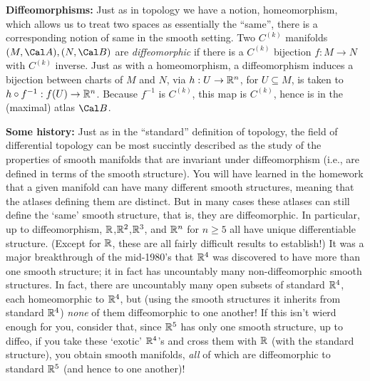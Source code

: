 \msk

{\bf Diffeomorphisms:} Just as in topology we have a notion, homeomorphism, which allows us to 
treat two spaces as essentially the ``same'', there is a corresponding 
notion of same in the smooth setting. Two $C^{(k)}$ manifolds $(M,{\Cal A}),(N,{\Cal B})$
are {\it diffeomorphic} if there is a $C^{(k)}$ bijection $f:M\rightarrow N$ with
$C^{(k)}$ inverse. Just as with a homeomorphism, a diffeomorphism induces a
bijection between charts of $M$ and $N$, via 
$h:U\rightarrow {\Bbb R}^n$, for $U\subseteq M$, is taken to 
$h\circ f^{-1}:f(U)\rightarrow {\Bbb R}^n$. Because $f^{-1}$ is $C^{(k)}$, this
map is $C^{(k)}$, hence is in the (maximal) atlas ${\Cal B}$.


{\bf Some history:} Just as in the ``standard'' definition of topology, the field of 
differential topology 
can be most succintly described as the study of the properties of smooth manifolds that
are invariant under diffeomorphism (i.e., are defined in terms of the smooth
structure). You will have learned in the homework that a given manifold can have
many different smooth structures, meaning that the atlases defining them are distinct.
But in many cases these atlases can still define the `same' smooth
structure, that is, they are diffeomorphic. In particular, up to diffeomorphism,
${\Bbb R}$,${\Bbb R}^2$,${\Bbb R}^3$, and ${\Bbb R}^n$ for $n\geq 5$ all have unique differentiable 
structure. (Except for ${\Bbb R}$, these are all fairly difficult results to establish!)
It was a major breakthrough of the mid-1980's that ${\Bbb R}^4$ was discovered
to have more than one smooth structure; it in fact has uncountably many non-diffeomorphic
smooth structures. In fact, there are uncountably many open subsets of standard
${\Bbb R}^4$, each homeomorphic to ${\Bbb R}^4$, but (using the smooth
structures it inherits from standard ${\Bbb R}^4$) {\it none}
of them diffeomorphic to one another! If this isn't wierd enough
for you, consider that, since ${\Bbb R}^5$ has only one smooth structure,
up to diffeo, if you take these `exotic' ${\Bbb R}^4$'s and cross them with
${\Bbb R}$ (with the standard structure), you obtain smooth manifolds, {\it all}
of which are diffeomorphic to standard ${\Bbb R}^5$ (and hence to one another)!

